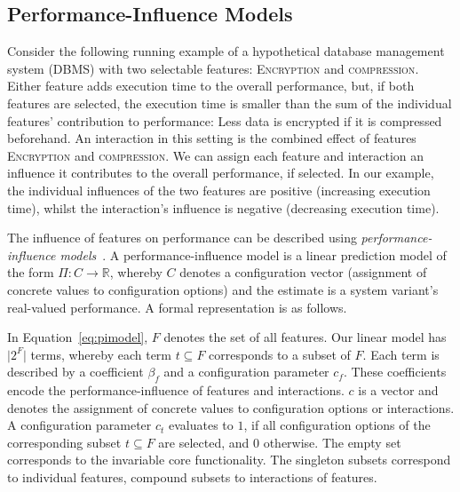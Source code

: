 \documentclass[sigconf]{acmart}
\begin{document}
	\subsection{Performance-Influence Models}\label{sec:pimodels}
	Consider the following running example of a hypothetical database management system (DBMS) with two selectable features: \textsc{Encryption} and \textsc{compression}.
	Either feature adds execution time to the overall performance, but, if both features are selected, the execution time is smaller than the sum of the individual features' contribution to performance: Less data is encrypted if it is compressed beforehand.
	An interaction in this setting is the combined effect of features \textsc{Encryption} and \textsc{compression}.
	We can assign each feature and interaction an influence it contributes to the overall performance, if selected. In our example, the individual influences of the two features are positive (increasing execution time), whilst the interaction's influence is negative (decreasing execution time).
	
	The influence of features on performance can be described using \emph{performance-influence models}~\cite{siegmundPerformanceinfluenceModelsHighly2015}.
	A performance-influence model is a linear prediction model of the form $\Pi:C\rightarrow \mathbb{R}$, whereby $C$ denotes a configuration vector (assignment of concrete values to configuration options) and the estimate is a system variant's real-valued performance.
	A formal representation is as follows.
	
	In Equation~\ref{eq:pimodel}, $F$ denotes the set of all features. Our linear model has $\vert 2^F\vert$ terms, whereby each term $t \subseteq F$ corresponds to a subset of $F$. Each term is described by a coefficient $\beta_f$ and a configuration parameter $c_f$.
	These coefficients encode the performance-influence of features and interactions. $c$ is a vector and denotes the assignment of concrete values to configuration options or interactions. A configuration parameter $c_t$ evaluates to $1$, if all configuration options of the corresponding subset $t \subseteq F$ are selected, and $0$ otherwise. The empty set corresponds to the invariable core functionality. The singleton subsets correspond to individual features, compound subsets to interactions of features.
	
\end{document}
